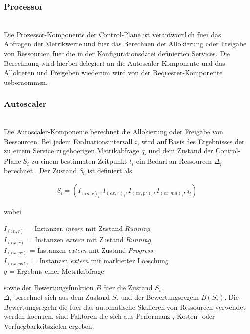 \documentclass[runningheads]{llncs}
\begin{document}
\subsubsection{Processor} \hfill\\

Die Prozessor-Komponente der Control-Plane ist verantwortlich fuer das Abfragen der Metrikwerte und fuer das Berechnen der Allokierung oder Freigabe von Ressourcen fuer die in der Konfigurationsdatei definierten Services. Die Berechnung wird hierbei delegiert an die Autoscaler-Komponente und das Allokieren und Freigeben wiederum wird von der Requester-Komponente uebernommen.
	
\subsubsection{Autoscaler} \label{autoscaler} \hfill\\

Die Autoscaler-Komponente berechnet die Allokierung oder Freigabe von Ressourcen. Bei jedem Evaluationsintervall $i$, wird auf Basis des Ergebnisses der zu einem Service zugehoerigen Metrikabfrage $q_{i}$ und dem Zustand der Control-Plane $S_{i}$ zu einem bestimmten Zeitpunkt $t_{i}$ ein Bedarf an Ressourcen $\Delta _{i}$ berechnet . Der Zustand $S_{i}$ ist definiert als

\begin{gather*}
	S_{i}=\left( I_{(in,r)_{i}}, I_{(ex,r)_{i}}, I_{(ex,pr)_{i}},  I_{(ex,md)_{i}} , q_{i} \right)
\end{gather*}

wobei

	$I_{(in,r)}$ = Instanzen \textit{intern} mit Zustand \textit{Running} \\
	$I_{(ex,r)}$ = Instanzen \textit{extern} mit Zustand \textit{Running} \\
	$I_{(ex,pr)}$ = Instanzen \textit{extern} mit Zustand \textit{Progress} \\
	$I_{(ex,md)}$ = Instanzen \textit{extern} mit markierter Loeschung \\
	$q$ = Ergebnis einer Metrikabfrage
	
sowie der Bewertungsfunktion  $B$ fuer die Zustand $S_{i}$. \\

$\Delta _{i}$ berechnet sich aus dem Zustand $S_{i}$ und der Bewertungsregeln $B(S_{i})$. Die Bewertungsregeln die fuer das automatische Skalieren von Ressourcen verwendet werden koennen, sind Faktoren die sich aus Performanz-, Kosten- oder Verfuegbarkeitszielen ergeben.\\
\end{document}
